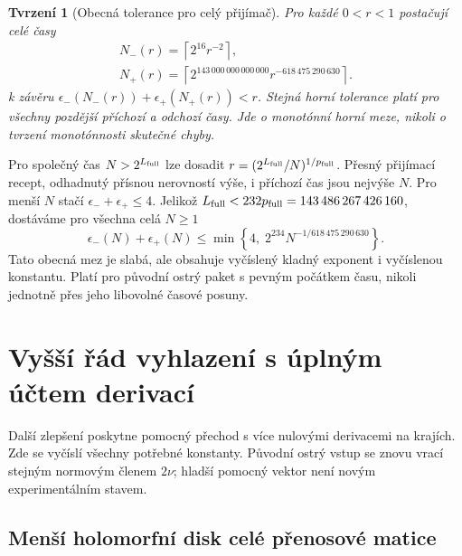 \documentclass[11pt,a4paper]{article}
\newtheorem{theorem}{Tvrzení}[section]
\theoremstyle{remark}\newtheorem{remark}[theorem]{Poznámka}
\numberwithin{equation}{section}
\begin{document}
\begin{theorem}[Obecná tolerance pro celý přijímač]
Pro každé \(0<r<1\) postačují celé časy
\begin{equation}
\boxed{\begin{gathered}
N_-(r)=\left\lceil2^{16}r^{-2}\right\rceil,\\
N_+(r)=\left\lceil2^{143\,000\,000\,000\,000}
r^{-618\,475\,290\,630}\right\rceil.
\end{gathered}}
\label{eq:fullgeneralrecipe}
\end{equation}
k závěru \(\epsilon_-(N_-(r))+\epsilon_+(N_+(r))<r\).
Stejná horní tolerance platí pro všechny pozdější příchozí a odchozí časy. Jde o monotónní horní meze, nikoli o tvrzení monotónnosti skutečné chyby.
\end{theorem}

Pro společný čas \(N>2^{L_{\rm full}}\) lze dosadit
\(r=(2^{L_{\rm full}}/N)^{1/p_{\rm full}}\).
Přesný přijímací recept, odhadnutý přísnou nerovností výše, i příchozí čas jsou nejvýše \(N\). Pro menší \(N\) stačí \(\epsilon_-+\epsilon_+\le4\). Jelikož
\(L_{\rm full}<232p_{\rm full}=143\,486\,267\,426\,160\), dostáváme pro všechna celá \(N\ge1\)
\begin{equation}
\boxed{
\epsilon_-(N)+\epsilon_+(N)
\le\min\left\{4,\;2^{234}N^{-1/618\,475\,290\,630}\right\}.
}
\label{eq:fullrate}
\end{equation}
Tato obecná mez je slabá, ale obsahuje vyčíslený kladný exponent i vyčíslenou konstantu. Platí pro původní ostrý paket s pevným počátkem času, nikoli jednotně přes jeho libovolné časové posuny.

\section{Vyšší řád vyhlazení s úplným účtem derivací}
\label{sec:higher}

Další zlepšení poskytne pomocný přechod s více nulovými derivacemi na krajích. Zde se vyčíslí všechny potřebné konstanty. Původní ostrý vstup se znovu vrací stejným normovým členem \(2\nu\); hladší pomocný vektor není novým experimentálním stavem.

\subsection{Menší holomorfní disk celé přenosové matice}
\end{document}
